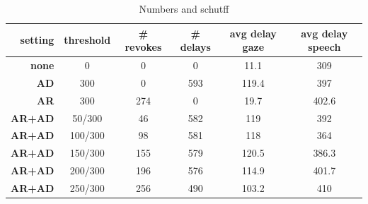 \documentclass[a4paper,10pt]{article}
\begin{document}
\begin{table}[ht]
\centering
\small
 \begin{tabular}{r|c|c|c|c|c}
\hline
\textbf{setting} & \textbf{threshold} &  \textbf{\# revokes} & \textbf{\# delays} & \textbf{avg delay gaze} & \textbf{avg delay speech}\\
\hline
\textbf{none}  & 0      & 0   & 0 & 11.1 & 309   \\
\textbf{AD}    & 300     & 0   & 593 & 119.4 & 397   \\
\textbf{AR}    & 300     & 274 & 0 & 19.7 & 402.6  \\
\textbf{AR+AD} & 50/300   & 46  & 582 & 119 & 392\\
\textbf{AR+AD} & 100/300  & 98  & 581 & 118 & 364\\
\textbf{AR+AD} & 150/300 & 155 & 579 & 120.5 & 386.3 \\
\textbf{AR+AD} & 200/300 & 196 & 576 & 114.9 & 401.7 \\
\textbf{AR+AD} & 250/300  & 256 & 490 & 103.2 & 410 \\
\end{tabular}
\caption{Numbers and schutff}
\label{tab:results}
\end{table}

%


  
  
\end{document}
